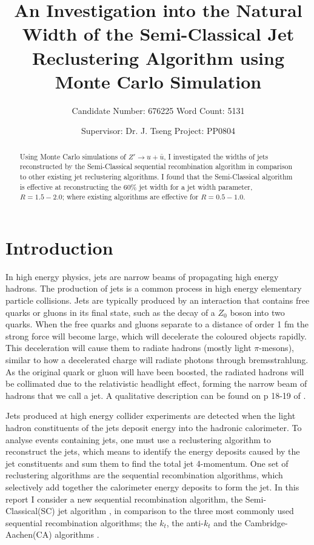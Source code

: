 \documentclass[a4paper,11pt, onecolumn]{article}
\title{\vspace{-0.3 in} An Investigation into the Natural Width of the Semi-Classical Jet Reclustering Algorithm using Monte Carlo Simulation \vspace{-1ex}}
\author{Candidate Number: 676225  \hspace{1in}     Word Count: 5131}
\date{\vspace{-2ex}\hspace{-0.22in} \hspace{0.07in}Supervisor: Dr. J. Tseng \hspace{1.2in} Project: PP0804 }
\begin{document}
    \maketitle
    \vspace{-1cm}
    \begin{abstract}
     
         \normalsize
         Using Monte Carlo simulations of $Z' \to u + \bar{u}$, I investigated the widths of jets reconstructed by the Semi-Classical sequential recombination
         algorithm in comparison to other existing jet reclustering algorithms. I found that the Semi-Classical algorithm
         is effective at reconstructing the 60\% jet width for a jet width parameter, $R = 1.5-2.0$; where existing algorithms are effective
         for $R = 0.5-1.0$.
   
    \end{abstract}


\section*{Introduction}

 In high energy physics, jets are narrow beams of propagating high energy hadrons. 
 The production of jets is a common process in high energy elementary particle collisions. Jets are typically 
 produced by an interaction that contains free quarks or gluons in its final state, such as the decay of a $Z_0$ boson into two quarks. When 
 the free quarks and gluons separate to a distance of order 1 fm the strong force will become large, which will decelerate the coloured
 objects rapidly. This deceleration will cause them to radiate hadrons (mostly light $\pi$-mesons), similar to how a decelerated charge will radiate photons through 
 bremsstrahlung. As the original quark or gluon will have been boosted, the radiated hadrons will be collimated due to the relativistic headlight 
 effect, forming the narrow beam of hadrons that we call a jet. A qualitative description can be found on p 18-19 of \cite{HalzenMartin}. \newline

 Jets produced at high energy collider experiments are detected when the light hadron constituents of the jets deposit energy
 into the hadronic calorimeter. To analyse events containing jets, one must use a reclustering algorithm to reconstruct 
 the jets, which means to identify the energy deposits caused by the jet constituents and sum them to find the total jet 4-momentum.
 One set of reclustering algorithms are the sequential recombination algorithms, which selectively add together the calorimeter energy deposits to form the jet.
 In this report I consider a new sequential recombination algorithm, the Semi-Classical(SC)
 jet algorithm \cite{sc}, in comparison to the three most commonly used sequential recombination algorithms;
 the $k_t$, the anti-$k_t$ and the Cambridge-Aachen(CA) algorithms \cite{salam}. \newline
\end{document}
